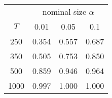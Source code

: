 % 
\begin{tabular}{cccc}
  \hline
  & \multicolumn{3}{c}{nominal size $\alpha$} \\
 $T$ & 0.01 & 0.05 & 0.1 \\
 \hline
250 & 0.354 & 0.557 & 0.687 \\ 
350 & 0.505 & 0.753 & 0.850 \\ 
  500 & 0.859 & 0.946 & 0.964 \\ 
  1000 & 0.997 & 1.000 & 1.000 \\ 
   \hline
\end{tabular}
